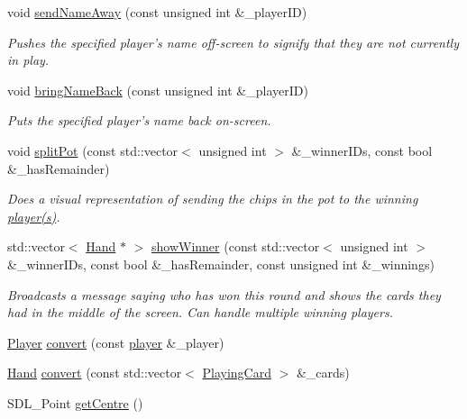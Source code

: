 \begin{DoxyCompactItemize}
void \hyperlink{classGUI_1_1DealerGUI_a44900148a67b4f63cbc020bff2f8d4bc}{send\-Name\-Away} (const unsigned int \&\-\_\-player\-I\-D)
\begin{DoxyCompactList}\small\item\em Pushes the specified player's name off-\/screen to signify that they are not currently in play. \end{DoxyCompactList}\item 
void \hyperlink{classGUI_1_1DealerGUI_a7b74fd6934299149fd9a6556c6f2936c}{bring\-Name\-Back} (const unsigned int \&\-\_\-player\-I\-D)
\begin{DoxyCompactList}\small\item\em Puts the specified player's name back on-\/screen. \end{DoxyCompactList}\item 
void \hyperlink{classGUI_1_1DealerGUI_a5d181369974bfa46fe359a70c14207b9}{split\-Pot} (const std\-::vector$<$ unsigned int $>$ \&\-\_\-winner\-I\-Ds, const bool \&\-\_\-has\-Remainder)
\begin{DoxyCompactList}\small\item\em Does a visual representation of sending the chips in the pot to the winning \hyperlink{classplayer}{player(s)}. \end{DoxyCompactList}\item 
std\-::vector$<$ \hyperlink{classGUI_1_1Hand}{Hand} $\ast$ $>$ \hyperlink{classGUI_1_1DealerGUI_a11958f49e40d21b97148c2335a0b6e6f}{show\-Winner} (const std\-::vector$<$ unsigned int $>$ \&\-\_\-winner\-I\-Ds, const bool \&\-\_\-has\-Remainder, const unsigned int \&\-\_\-winnings)
\begin{DoxyCompactList}\small\item\em Broadcasts a message saying who has won this round and shows the cards they had in the middle of the screen. Can handle multiple winning players. \end{DoxyCompactList}\item 
\hyperlink{structGUI_1_1Player}{Player} \hyperlink{classGUI_1_1DealerGUI_a59545beb9ff61c257cddf36d40f657b7}{convert} (const \hyperlink{classplayer}{player} \&\-\_\-player)
\item 
\hyperlink{classGUI_1_1Hand}{Hand} \hyperlink{classGUI_1_1DealerGUI_aca7d10268c0a29ef40486f262f48362a}{convert} (const std\-::vector$<$ \hyperlink{classPlayingCard}{Playing\-Card} $>$ \&\-\_\-cards)
\item 
S\-D\-L\-\_\-\-Point \hyperlink{classGUI_1_1DealerGUI_a38c3466ee4a78ea2b87dce4519fb04ba}{get\-Centre} ()

\end{DoxyCompactItemize}
